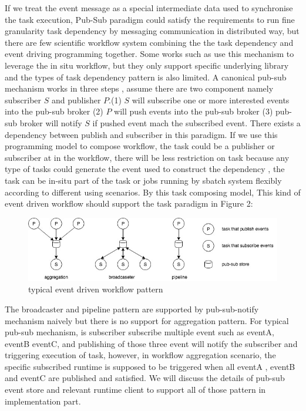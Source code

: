 If we treat the event message as a special intermediate data used to synchronise the task execution, Pub-Sub paradigm \cite{eugster2003many} could satisfy the requirements to run fine granularity task dependency by  messaging communication in distributed way, but there are few scientific workflow system combining the the task dependency and event driving programming together. Some works such as \cite{jin2012scalable} use this mechanism to leverage the in situ workflow, but they only support specific underlying library and the types of task dependency pattern is also limited. A canonical pub-sub mechanism works in three steps , assume there are two component namely subscriber $S$ and publisher $P$.(1) $S$ will subscribe one or more interested events into the pub-sub broker (2) $P$ will push events into the pub-sub broker (3)  pub-sub broker will notify $S$ if pushed event mach the subscribed event. There exists a dependency between publish and subscriber in this paradigm. If we use this programming model to compose workflow, the task could be a publisher or subscriber at in the workflow, there will be less restriction on task because any type of tasks could generate the event used to construct the dependency , the task can be in-situ part of the task or jobs running by sbatch system flexibly according to different using scenarios. By this task composing model,  This kind of event driven workflow should support the task paradigm in Figure 2:
\begin{figure} 
\centering
\includegraphics[width=.8\linewidth]{./figure/edtaskpattern.jpg}
\caption{typical event driven workflow pattern}
 \label{fg:state}
\end{figure} 

The broadcaster and pipeline pattern are supported by pub-sub-notify mechanism naively but there is no support for aggregation pattern. For typical pub-sub mechanism, is subscriber subscribe multiple event such as eventA, eventB eventC, and publishing of those three event will notify the subscriber and triggering execution of task, however, in workflow aggregation scenario, the specific subscribed runtime is supposed to be triggered when all eventA , eventB and eventC are published and satisfied. We will discuss the details of pub-sub event store and relevant runtime client to support all of those pattern in implementation part. 
